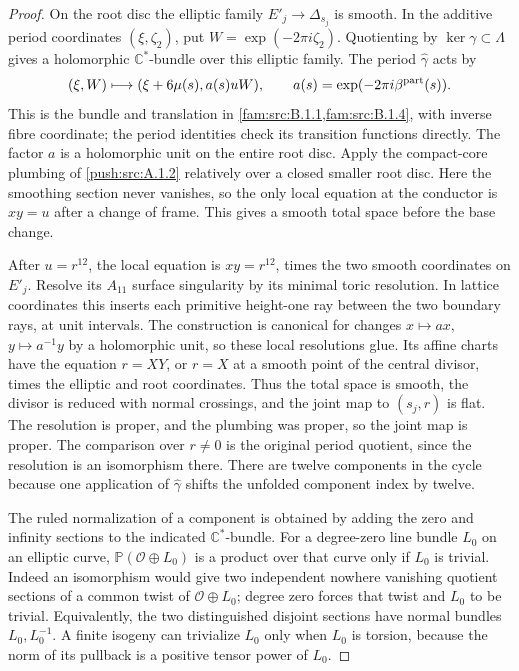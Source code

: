 \begin{proof}
On the root disc the elliptic family $E'_j\to\Delta_{s_j}$ is
smooth. In the additive period coordinates $(\xi,\zeta_2)$,
put $W=\exp(-2\pi i\zeta_2)$. Quotienting by
$\ker\gamma\subset\Lambda$ gives a holomorphic
$\mathbb C^*$-bundle over this elliptic family. The period
$\widehat\gamma$ acts by
\[
 (\xi,W)\longmapsto
 (\xi+6\mu(s),a(s)uW),\qquad
 a(s)=\exp(-2\pi i\beta^{\rm part}(s)).
\]
This is the bundle and translation in \cref{fam:src:B.1.1,fam:src:B.1.4}, with inverse fibre
coordinate; the period identities check its transition
functions directly. The factor $a$ is a holomorphic unit on
the entire root disc. Apply the compact-core plumbing of
\ref{push:src:A.1.2} relatively over a closed smaller root disc. Here the
smoothing section never vanishes, so the only local equation
at the conductor is $xy=u$ after a change of frame. This
gives a smooth total space before the base change.

After $u=r^{12}$, the local equation is $xy=r^{12}$,
times the two smooth coordinates on $E'_j$. Resolve its
$A_{11}$ surface singularity by its minimal toric resolution.
In lattice coordinates this inserts each primitive height-one
ray between the two boundary rays, at unit intervals. The
construction is canonical for changes $x\mapsto a x$,
$y\mapsto a^{-1}y$ by a holomorphic unit, so these local
resolutions glue. Its affine charts have the equation
$r=XY$, or $r=X$ at a smooth point of the central divisor,
times the elliptic and root coordinates. Thus the total space
is smooth, the divisor is reduced with normal crossings, and
the joint map to $(s_j,r)$ is flat. The resolution is proper,
and the plumbing was proper, so the joint map is proper.
The comparison over $r\ne0$ is the original period quotient,
since the resolution is an isomorphism there. There are
twelve components in the cycle because one application of
$\widehat\gamma$ shifts the unfolded component index by
twelve.

The ruled normalization of a component is obtained by adding
the zero and infinity sections to the indicated
$\mathbb C^*$-bundle. For a degree-zero line bundle $L_0$
on an elliptic curve, $\mathbb P(\mathcal O\oplus L_0)$
is a product over that curve only if $L_0$ is trivial.
Indeed an isomorphism would give two independent nowhere
vanishing quotient sections of a common twist of
$\mathcal O\oplus L_0$; degree zero forces that twist and
$L_0$ to be trivial. Equivalently, the two distinguished
disjoint sections have normal bundles $L_0,L_0^{-1}$.
A finite isogeny can trivialize $L_0$ only when $L_0$ is
torsion, because the norm of its pullback is a positive
tensor power of $L_0$.


\end{proof}
